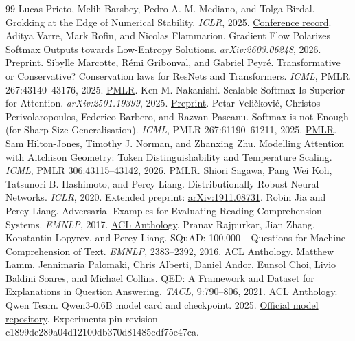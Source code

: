 \documentclass[10pt,a4paper]{article}
\begin{document}
\begin{thebibliography}{99}
 Lucas Prieto, Melih Barsbey, Pedro A. M. Mediano, and Tolga Birdal. Grokking at the Edge of Numerical Stability. \emph{ICLR}, 2025. \href{https://iclr.cc/virtual/2025/poster/29501}{Conference record}.
 Aditya Varre, Mark Rofin, and Nicolas Flammarion. Gradient Flow Polarizes Softmax Outputs towards Low-Entropy Solutions. \emph{arXiv:2603.06248}, 2026. \href{https://arxiv.org/abs/2603.06248}{Preprint}.
 Sibylle Marcotte, R\'emi Gribonval, and Gabriel Peyr\'e. Transformative or Conservative? Conservation laws for ResNets and Transformers. \emph{ICML}, PMLR 267:43140--43176, 2025. \href{https://proceedings.mlr.press/v267/marcotte25a.html}{PMLR}.
 Ken M. Nakanishi. Scalable-Softmax Is Superior for Attention. \emph{arXiv:2501.19399}, 2025. \href{https://arxiv.org/abs/2501.19399}{Preprint}.
 Petar Veli\v{c}kovi\'c, Christos Perivolaropoulos, Federico Barbero, and Razvan Pascanu. Softmax is not Enough (for Sharp Size Generalisation). \emph{ICML}, PMLR 267:61190--61211, 2025. \href{https://proceedings.mlr.press/v267/velickovic25a.html}{PMLR}.
 Sam Hilton-Jones, Timothy J. Norman, and Zhanxing Zhu. Modelling Attention with Aitchison Geometry: Token Distinguishability and Temperature Scaling. \emph{ICML}, PMLR 306:43115--43142, 2026. \href{https://proceedings.mlr.press/v306/hilton-jones26a.html}{PMLR}.
 Shiori Sagawa, Pang Wei Koh, Tatsunori B. Hashimoto, and Percy Liang. Distributionally Robust Neural Networks. \emph{ICLR}, 2020. Extended preprint: \href{https://arxiv.org/abs/1911.08731}{arXiv:1911.08731}.
 Robin Jia and Percy Liang. Adversarial Examples for Evaluating Reading Comprehension Systems. \emph{EMNLP}, 2017. \href{https://aclanthology.org/D17-1215/}{ACL Anthology}.
 Pranav Rajpurkar, Jian Zhang, Konstantin Lopyrev, and Percy Liang. SQuAD: 100,000+ Questions for Machine Comprehension of Text. \emph{EMNLP}, 2383--2392, 2016. \href{https://aclanthology.org/D16-1264/}{ACL Anthology}.
 Matthew Lamm, Jennimaria Palomaki, Chris Alberti, Daniel Andor, Eunsol Choi, Livio Baldini Soares, and Michael Collins. QED: A Framework and Dataset for Explanations in Question Answering. \emph{TACL}, 9:790--806, 2021. \href{https://aclanthology.org/2021.tacl-1.48/}{ACL Anthology}.
 Qwen Team. Qwen3-0.6B model card and checkpoint. 2025. \href{https://huggingface.co/Qwen/Qwen3-0.6B}{Official model repository}. Experiments pin revision c1899de289a04d12100db370d81485cdf75e47ca.
\end{thebibliography}
\end{document}

